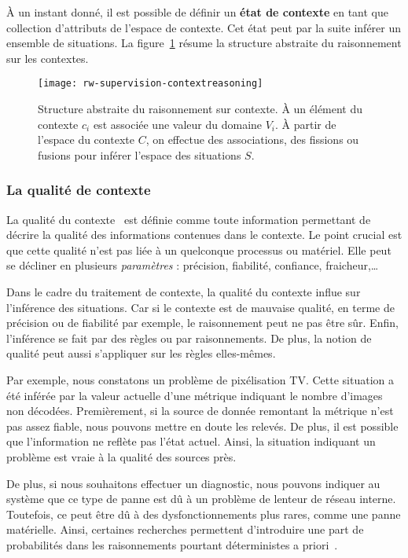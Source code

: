 À un instant donné, il est possible de définir un \textbf{état de contexte} en tant que collection d'attributs de l'espace de contexte. Cet état peut par la suite inférer un ensemble de situations. La figure~\ref{rw-supervision-contextreasoning} résume la structure abstraite du raisonnement sur les contextes.

\begin{figure}[ht]
    \centering
    \texttt{[image: rw-supervision-contextreasoning]}
    \caption{Structure abstraite du raisonnement sur contexte. À un élément du contexte $c_i$ est associée une valeur du domaine $V_i$. À partir de l'espace du contexte $C$, on effectue des associations, des fissions ou fusions pour inférer l'espace des situations $S$.}\label{rw-supervision-contextreasoning}
\end{figure}

\subsubsection{La qualité de contexte}
La qualité du contexte~\cite{Buchholz:quality} est définie comme toute information permettant de décrire la qualité des informations contenues dans le contexte. Le point crucial est que cette qualité n'est pas liée à un quelconque processus ou matériel. Elle peut se décliner en plusieurs \textit{paramètres} : précision, fiabilité, confiance, fraicheur,\dots{}

Dans le cadre du traitement de contexte, la qualité du contexte influe sur l'inférence des situations. Car si le contexte est de mauvaise qualité, en terme de précision ou de fiabilité par exemple, le raisonnement peut ne pas être sûr. Enfin, l'inférence se fait par des règles ou par raisonnements. De plus, la notion de qualité peut aussi s'appliquer sur les règles elles-mêmes.

Par exemple, nous constatons un problème de pixélisation TV. Cette situation a été inférée par la valeur actuelle d'une métrique indiquant le nombre d'images non décodées. Premièrement, si la source de donnée remontant la métrique n'est pas assez fiable, nous pouvons mettre en doute les relevés. De plus, il est possible que l'information ne reflète pas l'état actuel. Ainsi, la situation indiquant un problème est vraie à la qualité des sources près.

De plus, si nous souhaitons effectuer un diagnostic, nous pouvons indiquer au système que ce type de panne est dû à un problème de lenteur de réseau interne. Toutefois, ce peut être dû à des dysfonctionnements plus rares, comme une panne matérielle. Ainsi, certaines recherches permettent d'introduire une part de probabilités dans les raisonnements pourtant déterministes a priori~\cite{Padovitz:agent}.

